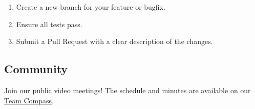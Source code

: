 \begin{enumerate}
\item Create a new branch for your feature or bugfix.
\item Ensure all tests pass.
\item Submit a Pull Request with a clear description of the changes.
\end{enumerate}


\subsection{Community}


Join our public video meetings! The schedule and minutes are available on our \href{https://jupyter-xeus.github.io/}{Team Compass}.

